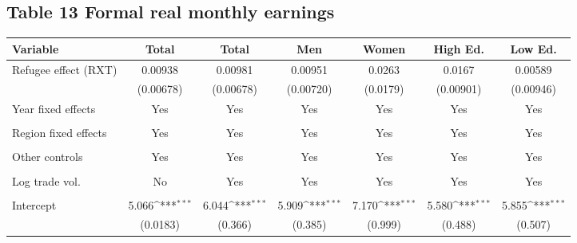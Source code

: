 \documentclass{article}
\begin{document}
\subsection*{Table 13 Formal real monthly earnings}
\Floatbarrier
\centering
{
\def\sym#1{\ifmmode^{#1}\else\(^{#1}\)\fi}
\begin{tabular}{l*{6}{c}}
\hline
\hline

Variable
            &\multicolumn{1}{c}{Total}&\multicolumn{1}{c}{Total}&\multicolumn{1}{c}{Men}&\multicolumn{1}{c}{Women}&\multicolumn{1}{c}{High Ed.}&\multicolumn{1}{c}{Low Ed.}\\
\hline
Refugee effect (RXT)         &     0.00938         &     0.00981         &     0.00951         &      0.0263         &      0.0167         &     0.00589         \\
            &   (0.00678)         &   (0.00678)         &   (0.00720)         &    (0.0179)         &   (0.00901)         &   (0.00946)         \\
[1em]
Year fixed effects         &       Yes&       Yes&                     Yes&                    Yes &       Yes&      Yes\\
            &            &            &                     &                     &             &            \\
[1em]
Region fixed effects     &       Yes&       Yes&       Yes&     Yes         &       Yes&       Yes\\
            &           &            &           &             &             &           \\
[1em]
Other controls       &      Yes &      Yes &      Yes &   Yes        &    Yes         &      Yes  \\
            &           &            &           &             &             &            \\
[1em]
Log trade vol.   &                     No&    Yes        &     Yes         &      Yes         &    Yes        &     Yes         \\
            &                     &            &             &            &             &            \\
[1em]
Intercept      &       5.066\sym{***}&       6.044\sym{***}&       5.909\sym{***}&       7.170\sym{***}&       5.580\sym{***}&       5.855\sym{***}\\
            &    (0.0183)         &     (0.366)         &     (0.385)         &     (0.999)         &     (0.488)         &     (0.507)         \\

\end{tabular}}
\end{document}
